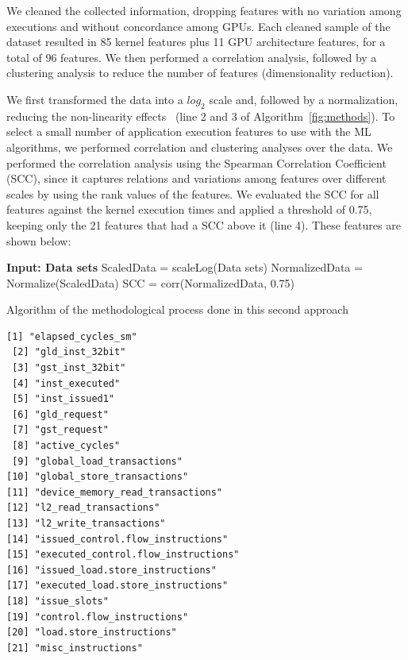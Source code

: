 We cleaned the collected information, dropping features with no variation among executions and without concordance among GPUs. Each cleaned sample of the dataset resulted in 85 kernel features plus 11 GPU architecture features, for a total of 96 features. We then performed a correlation analysis, followed by a clustering analysis to reduce the number of features (dimensionality reduction). 

We first transformed the data into a $log_2$ scale and, followed by a normalization, reducing the non-linearity effects~\citep{Barnes:2008:RAS} (line 2 and 3 of Algorithm~\ref{fig:methods}). To select a small number of application execution features to use with the ML algorithms, we performed correlation and clustering analyses over the data. We performed the correlation analysis using the Spearman Correlation Coefficient (SCC), since it captures relations and variations among features over different scales by using the rank values of the features. We evaluated the SCC for all features against the kernel execution times and applied a threshold of 0.75, keeping only the 21 features that had a SCC above it (line 4). These features are shown below:

\begin{algorithm}[htpb]
\SetAlgoLined
{}
\textbf{Input: Data sets}\;
ScaledData = scaleLog(Data sets)\;
NormalizedData = Normalize(ScaledData)\;
SCC = corr(NormalizedData, 0.75)\;
\caption{Algorithm of the methodological process done in this second approach} 
\label{fig:methods}
\end{algorithm}

\begin{lstlisting}[basicstyle=\small, numbers=none]
 [1] "elapsed_cycles_sm"                 
 [2] "gld_inst_32bit"                    
 [3] "gst_inst_32bit"                    
 [4] "inst_executed"                     
 [5] "inst_issued1"                      
 [6] "gld_request"                       
 [7] "gst_request"                       
 [8] "active_cycles"                     
 [9] "global_load_transactions"          
[10] "global_store_transactions"         
[11] "device_memory_read_transactions"   
[12] "l2_read_transactions"              
[13] "l2_write_transactions"             
[14] "issued_control.flow_instructions"  
[15] "executed_control.flow_instructions"
[16] "issued_load.store_instructions"    
[17] "executed_load.store_instructions"  
[18] "issue_slots"                       
[19] "control.flow_instructions"         
[20] "load.store_instructions"           
[21] "misc_instructions"  
\end{lstlisting}

